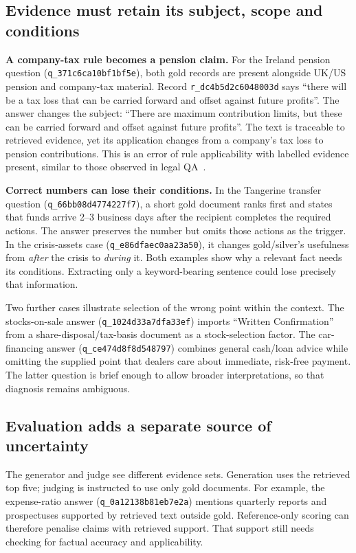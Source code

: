 \subsection{Evidence must retain its subject, scope and conditions}

\textbf{A company-tax rule becomes a pension claim.}
For the Ireland pension question (\texttt{q\_371c6ca10bf1bf5e}), both gold
records are present alongside UK/US pension and company-tax material.
Record \texttt{r\_dc4b5d2c6048003d} says ``there will be a tax loss that can be
carried forward and offset against future profits''.
The answer changes the subject: ``There are maximum contribution limits, but
these can be carried forward and offset against future profits''.
The text is traceable to retrieved evidence, yet its application changes from
a company's tax loss to pension contributions.
This is an error of rule applicability with labelled evidence present,
similar to those observed in legal QA~\citep{yao2026law}.

\textbf{Correct numbers can lose their conditions.}
In the Tangerine transfer question (\texttt{q\_66bb08d4774227f7}), a short gold
document ranks first and states that funds arrive 2--3 business days after
the recipient completes the required actions. The answer preserves the number
but omits those actions as the trigger.
In the crisis-assets case (\texttt{q\_e86dfaec0aa23a50}), it changes gold/silver's
usefulness from \emph{after} the crisis to \emph{during} it.
Both examples show why a relevant fact needs its conditions.
Extracting only a keyword-bearing sentence could lose precisely that information.

Two further cases illustrate selection of the wrong point within the context.
The stocks-on-sale answer (\texttt{q\_1024d33a7dfa33ef}) imports ``Written
Confirmation'' from a share-disposal/tax-basis document as a stock-selection
factor. The car-financing answer (\texttt{q\_ce474d8f8d548797}) combines general
cash/loan advice while omitting the supplied point that dealers care about
immediate, risk-free payment. The latter question is brief enough to allow
broader interpretations, so that diagnosis remains ambiguous.

\subsection{Evaluation adds a separate source of uncertainty}

The generator and judge see different evidence sets. Generation uses the
retrieved top five; judging is instructed to use only gold documents.
For example, the expense-ratio answer (\texttt{q\_0a12138b81eb7e2a}) mentions
quarterly reports and prospectuses supported by retrieved text outside gold.
Reference-only scoring can therefore penalise claims with retrieved support.
That support still needs checking for factual accuracy and applicability.

